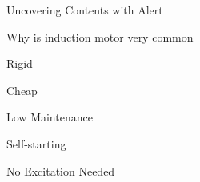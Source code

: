 \documentclass[aspectratio=169, xcolor={x11names}]{beamer}
\begin{document}
\begin{frame}{Uncovering Contents with Alert}

    \begin{block}{Why is induction motor very common}
        \uncover<+->{\phantom{$1$}}

        \begin{description}[<+- | alert@+>]
            \item[Rigid] Rigid
            \item[Cheap] Cheap
            \item[Low Maintenance] Low Maintenance
            \item[Self-Starting] Self-starting
            \item[No Excitation Needed] No Excitation Needed
        \end{description}


    \end{block}

\end{frame}
\end{document}
